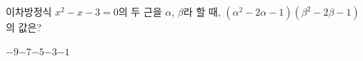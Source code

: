 이차방정식 $x^2-x-3=0$의 두 근을 $\alpha$, $\beta$라 할 때, $(\alpha^2-2\alpha-1)(\beta^2-2\beta-1)$의 값은?
\begin{choices32}{$-9$}{$-7$}{$-5$}{$-3$}{$-1$}\end{choices32}
